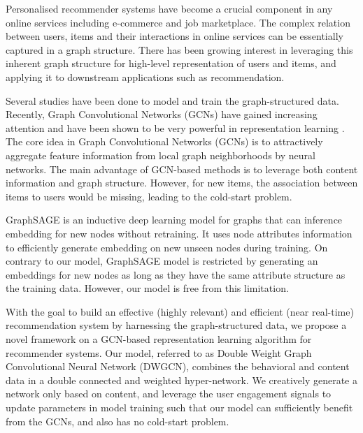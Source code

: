 \documentclass[manuscript,screen,review]{acmart}
\begin{document}
Personalised recommender systems have become a crucial component in any online services including e-commerce and job marketplace. The complex relation between users, items and their interactions in online services can be essentially captured in a graph structure. There has been growing interest in leveraging this inherent graph structure for high-level representation of users and items, and applying it to downstream applications such as recommendation.


Several studies have been done to model and train the graph-structured data. Recently, Graph Convolutional Networks (GCNs) have gained increasing attention and have been shown to be very powerful in representation learning \cite{chen2021structured}. The core idea in Graph Convolutional Networks (GCNs) is to attractively aggregate feature information from local graph neighborhoods by neural networks. The main advantage of GCN-based methods is to leverage both content information and graph structure. However, for new items, the association between items to users would be missing, leading to the cold-start problem.

GraphSAGE \cite{hamilton2017inductive} is an inductive deep learning model for graphs that can inference embedding for new nodes without retraining. It uses node attributes information to efficiently generate embedding on new unseen nodes during training. On contrary to our model,  GraphSAGE model is restricted by generating an embeddings for new nodes as long as they have the same attribute structure as the training data. However, our model is free from this limitation.

With the goal to build an effective (highly relevant) and efficient (near real-time) recommendation system by harnessing the graph-structured data,
we propose a novel framework on a GCN-based representation learning algorithm for recommender systems. Our model, referred to as Double Weight Graph Convolutional Neural Network (DWGCN), combines the behavioral and content data in a double connected and weighted hyper-network. We creatively generate a network only based on content, and leverage the user engagement signals to update parameters in model training such that our model can sufficiently benefit from the GCNs, and also has no cold-start problem. 
\end{document}
